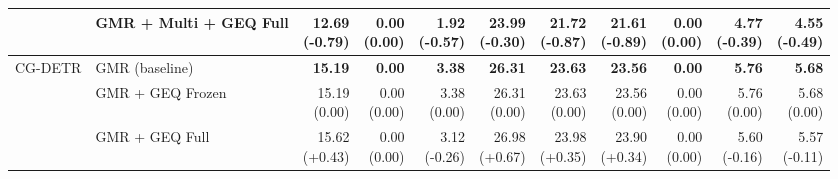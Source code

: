 \documentclass{article}
\begin{document}
{\begin{tabular}{llrrrrrrrrr}
 & GMR + Multi + GEQ Full & \shortstack{12.69 \\ {\scriptsize\textcolor{Loss}{(-0.79)}}} & \shortstack{0.00 \\ {\scriptsize\textcolor{Zero}{(0.00)}}} & \shortstack{1.92 \\ {\scriptsize\textcolor{Loss}{(-0.57)}}} & \shortstack{23.99 \\ {\scriptsize\textcolor{Loss}{(-0.30)}}} & \shortstack{21.72 \\ {\scriptsize\textcolor{Loss}{(-0.87)}}} & \shortstack{21.61 \\ {\scriptsize\textcolor{Loss}{(-0.89)}}} & \shortstack{0.00 \\ {\scriptsize\textcolor{Zero}{(0.00)}}} & \shortstack{4.77 \\ {\scriptsize\textcolor{Loss}{(-0.39)}}} & \shortstack{4.55 \\ {\scriptsize\textcolor{Loss}{(-0.49)}}} \\
\midrule
CG-DETR & GMR (baseline) & \textbf{15.19} & \textbf{0.00} & \textbf{3.38} & \textbf{26.31} & \textbf{23.63} & \textbf{23.56} & \textbf{0.00} & \textbf{5.76} & \textbf{5.68} \\
 & GMR + GEQ Frozen & \shortstack{15.19 \\ {\scriptsize\textcolor{Zero}{(0.00)}}} & \shortstack{0.00 \\ {\scriptsize\textcolor{Zero}{(0.00)}}} & \shortstack{3.38 \\ {\scriptsize\textcolor{Zero}{(0.00)}}} & \shortstack{26.31 \\ {\scriptsize\textcolor{Zero}{(0.00)}}} & \shortstack{23.63 \\ {\scriptsize\textcolor{Zero}{(0.00)}}} & \shortstack{23.56 \\ {\scriptsize\textcolor{Zero}{(0.00)}}} & \shortstack{0.00 \\ {\scriptsize\textcolor{Zero}{(0.00)}}} & \shortstack{5.76 \\ {\scriptsize\textcolor{Zero}{(0.00)}}} & \shortstack{5.68 \\ {\scriptsize\textcolor{Zero}{(0.00)}}} \\
 & GMR + GEQ Full & \shortstack{15.62 \\ {\scriptsize\textcolor{Gain}{(+0.43)}}} & \shortstack{0.00 \\ {\scriptsize\textcolor{Zero}{(0.00)}}} & \shortstack{3.12 \\ {\scriptsize\textcolor{Loss}{(-0.26)}}} & \shortstack{26.98 \\ {\scriptsize\textcolor{Gain}{(+0.67)}}} & \shortstack{23.98 \\ {\scriptsize\textcolor{Gain}{(+0.35)}}} & \shortstack{23.90 \\ {\scriptsize\textcolor{Gain}{(+0.34)}}} & \shortstack{0.00 \\ {\scriptsize\textcolor{Zero}{(0.00)}}} & \shortstack{5.60 \\ {\scriptsize\textcolor{Loss}{(-0.16)}}} & \shortstack{5.57 \\ {\scriptsize\textcolor{Loss}{(-0.11)}}} \\

\end{tabular}}
\end{document}
